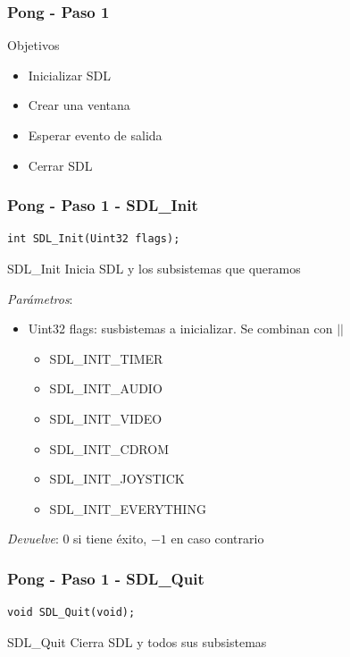 \begin{frame}
	\frametitle{Pong - Paso 1}
	
	\begin{block}{Objetivos}
		\begin{itemize}
			\item Inicializar SDL
			\item Crear una ventana
			\item Esperar evento de salida
			\item Cerrar SDL
		\end{itemize}            
	\end{block}

\end{frame}

\begin{frame}[fragile]
    \frametitle{Pong - Paso 1 - SDL\_Init}
	
\begin{verbatim}
int SDL_Init(Uint32 flags);
\end{verbatim}

    \begin{block}{SDL\_Init}
	Inicia SDL y los subsistemas que queramos
	
	\emph{Parámetros}:
	\begin{itemize}
	    \item Uint32 flags: susbistemas a inicializar. Se combinan con $||$
		\begin{itemize}
		    \item SDL\_INIT\_TIMER
		    \item SDL\_INIT\_AUDIO
		    \item SDL\_INIT\_VIDEO
		    \item SDL\_INIT\_CDROM
		    \item SDL\_INIT\_JOYSTICK
		    \item SDL\_INIT\_EVERYTHING
		\end{itemize}
	\end{itemize}
	
	\emph{Devuelve}: $0$ si tiene éxito, $-1$ en caso contrario

    \end{block}

\end{frame}

\begin{frame}[fragile]
    \frametitle{Pong - Paso 1 - SDL\_Quit}
	
\begin{verbatim}
void SDL_Quit(void);
\end{verbatim}

    \begin{block}{SDL\_Quit}
	Cierra SDL y todos sus subsistemas
    \end{block}

\end{frame}


